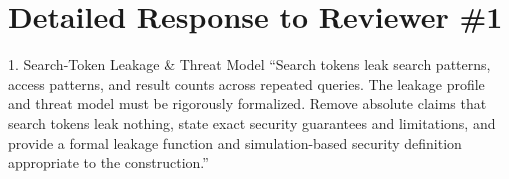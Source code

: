 \documentclass[11pt,a4paper]{article}
\begin{document}
\vspace{1.5em}

\section{Detailed Response to Reviewer \#1}

\begin{reviewbox}{1. Search-Token Leakage \& Threat Model}
``Search tokens leak search patterns, access patterns, and result counts across repeated queries. The leakage profile and threat model must be rigorously formalized. Remove absolute claims that search tokens leak nothing, state exact security guarantees and limitations, and provide a formal leakage function and simulation-based security definition appropriate to the construction.''
\end{reviewbox}
\end{document}
